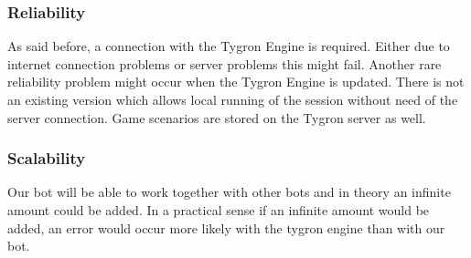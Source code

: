 \subsubsection{Reliability}
As said before, a connection with the Tygron Engine is required. Either due to internet connection problems or server problems this might fail. Another rare reliability problem might occur when the Tygron Engine is updated. There is not an existing version which allows local running of the session without need of the server connection. Game scenarios are stored on the Tygron server as well.

\subsubsection{Scalability}
Our bot will be able to work together with other bots and in theory an infinite amount could be added. In a practical sense if an infinite amount would be added, an error would occur more likely with the tygron engine than with our bot.

\newpage